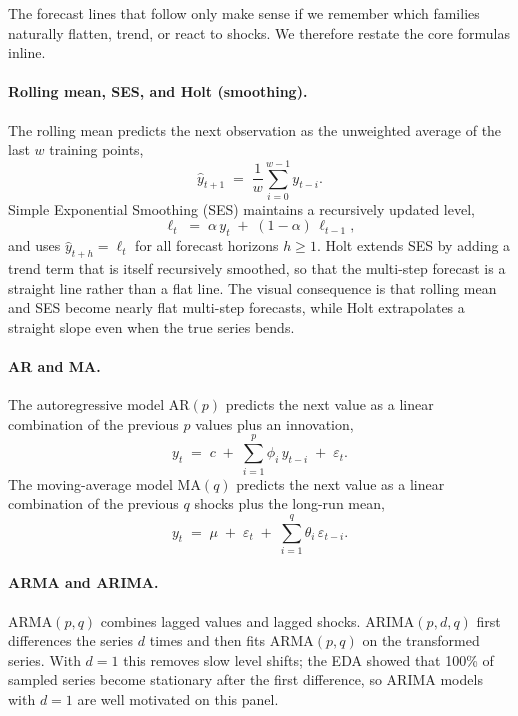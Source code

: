 The forecast lines that follow only make sense if we remember which families naturally flatten, trend, or react to shocks. We therefore restate the core formulas inline.

\paragraph{Rolling mean, SES, and Holt (smoothing).}
The rolling mean predicts the next observation as the unweighted average of the last $w$ training points,
\begin{equation}
  \hat y_{t+1} \;=\; \frac{1}{w}\sum_{i=0}^{w-1} y_{t-i}.
\end{equation}
Simple Exponential Smoothing (SES) maintains a recursively updated level,
\begin{equation}
  \ell_t \;=\; \alpha\, y_t \;+\; (1-\alpha)\,\ell_{t-1},
\end{equation}
and uses $\hat y_{t+h} = \ell_t$ for all forecast horizons $h \ge 1$. Holt extends SES by adding a trend term that is itself recursively smoothed, so that the multi-step forecast is a straight line rather than a flat line. The visual consequence is that rolling mean and SES become nearly flat multi-step forecasts, while Holt extrapolates a straight slope even when the true series bends.

\paragraph{AR and MA.}
The autoregressive model AR$(p)$ predicts the next value as a linear combination of the previous $p$ values plus an innovation,
\begin{equation}
  y_t \;=\; c \;+\; \sum_{i=1}^{p} \phi_i \, y_{t-i} \;+\; \varepsilon_t.
\end{equation}
The moving-average model MA$(q)$ predicts the next value as a linear combination of the previous $q$ shocks plus the long-run mean,
\begin{equation}
  y_t \;=\; \mu \;+\; \varepsilon_t \;+\; \sum_{i=1}^{q} \theta_i \,\varepsilon_{t-i}.
\end{equation}

\paragraph{ARMA and ARIMA.}
ARMA$(p,q)$ combines lagged values and lagged shocks. ARIMA$(p,d,q)$ first differences the series $d$ times and then fits ARMA$(p,q)$ on the transformed series. With $d = 1$ this removes slow level shifts; the EDA showed that 100\% of sampled series become stationary after the first difference, so ARIMA models with $d = 1$ are well motivated on this panel.

